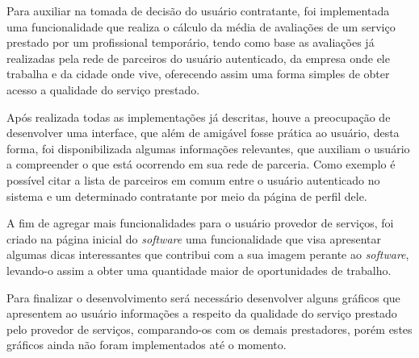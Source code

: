 \par Para auxiliar na tomada de decisão do usuário contratante, foi implementada uma funcionalidade que realiza o cálculo da média de avaliações de um serviço prestado por um profissional temporário, tendo como base as avaliações já realizadas pela rede de parceiros do usuário autenticado, da empresa onde ele trabalha e da cidade onde vive, oferecendo assim uma forma simples de obter acesso a qualidade do serviço prestado.

\par Após realizada todas as implementações já descritas, houve a preocupação de desenvolver uma interface, que além de amigável fosse prática ao usuário, desta forma, foi disponibilizada algumas informações relevantes, que auxiliam o usuário a compreender o que está ocorrendo em sua rede de parceria. Como exemplo é possível citar a lista de parceiros em comum entre o usuário autenticado no sistema e um determinado contratante por meio da página de perfil dele.

\par A fim de agregar mais funcionalidades para o usuário provedor de serviços, foi criado na página inicial do \textit{software} uma funcionalidade que visa apresentar algumas dicas interessantes que contribui com a sua imagem perante ao \textit{software}, levando-o assim a obter uma quantidade maior de oportunidades de trabalho.

\par Para finalizar o desenvolvimento será necessário desenvolver alguns gráficos que apresentem ao usuário informações a respeito da qualidade do serviço prestado pelo provedor de serviços, comparando-os com os demais prestadores, porém estes gráficos ainda não foram implementados até o momento.
